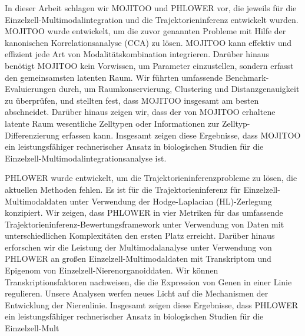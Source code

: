 In dieser Arbeit schlagen wir MOJITOO und PHLOWER vor, die jeweils für die Einzelzell-Multimodalintegration und die Trajektorieninferenz entwickelt wurden. MOJITOO wurde entwickelt, um die zuvor genannten Probleme mit Hilfe der kanonischen Korrelationsanalyse (CCA) zu lösen. MOJITOO kann effektiv und effizient jede Art von Modalitätskombination integrieren. Darüber hinaus benötigt MOJITOO kein Vorwissen, um Parameter einzustellen, sondern erfasst den gemeinsamsten latenten Raum. Wir führten umfassende Benchmark-Evaluierungen durch, um Raumkonservierung, Clustering und Distanzgenauigkeit zu überprüfen, und stellten fest, dass MOJITOO insgesamt am besten abschneidet. Darüber hinaus zeigen wir, dass der von MOJITOO erhaltene latente Raum wesentliche Zelltypen oder Informationen zur Zelltyp-Differenzierung erfassen kann. Insgesamt zeigen diese Ergebnisse, dass MOJITOO ein leistungsfähiger rechnerischer Ansatz in biologischen Studien für die Einzelzell-Multimodalintegrationsanalyse ist.

PHLOWER wurde entwickelt, um die Trajektorieninferenzprobleme zu lösen, die aktuellen Methoden fehlen. Es ist für die Trajektorieninferenz für Einzelzell-Multimodaldaten unter Verwendung der Hodge-Laplacian (HL)-Zerlegung konzipiert. Wir zeigen, dass PHLOWER in vier Metriken für das umfassende Trajektorieninferenz-Bewertungsframework unter Verwendung von Daten mit unterschiedlichen Komplexitäten den ersten Platz erreicht. Darüber hinaus erforschen wir die Leistung der Multimodalanalyse unter Verwendung von PHLOWER an großen Einzelzell-Multimodaldaten mit Transkriptom und Epigenom von Einzelzell-Nierenorganoiddaten. Wir können Transkriptionsfaktoren nachweisen, die die Expression von Genen in einer Linie regulieren. Unsere Analysen werfen neues Licht auf die Mechanismen der Entwicklung der Nierenlinie. Insgesamt zeigen diese Ergebnisse, dass PHLOWER ein leistungsfähiger rechnerischer Ansatz in biologischen Studien für die Einzelzell-Mult